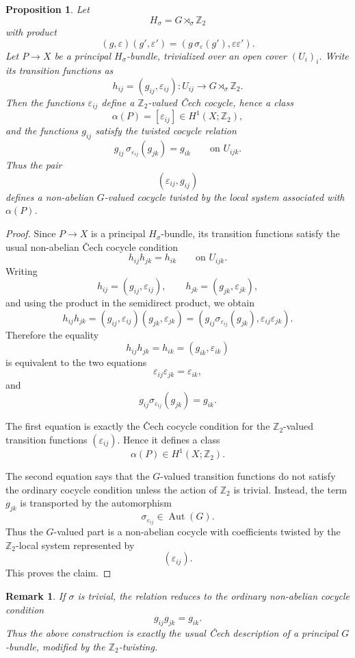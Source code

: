 \documentclass[11pt]{amsart}
\newtheorem{proposition}[definition]{Proposition}
\newtheorem{remark}[definition]{Remark}
\begin{document}
\begin{proposition}
Let
\[
H_\sigma=G\rtimes_\sigma \mathbb Z_2
\]
with product
\[
(g,\varepsilon)(g',\varepsilon')
=
(g\,\sigma_\varepsilon(g'),\varepsilon\varepsilon').
\]
Let \(P\to X\) be a principal \(H_\sigma\)-bundle, trivialized over an open
cover \((U_i)_i\). Write its transition functions as
\[
h_{ij}=(g_{ij},\varepsilon_{ij})
:
U_{ij}\to G\rtimes_\sigma\mathbb Z_2.
\]
Then the functions \(\varepsilon_{ij}\) define a \(\mathbb Z_2\)-valued
Čech cocycle, hence a class
\[
\alpha(P)=[\varepsilon_{ij}]\in H^1(X;\mathbb Z_2),
\]
and the functions \(g_{ij}\) satisfy the twisted cocycle relation
\[
g_{ij}\,\sigma_{\varepsilon_{ij}}(g_{jk})
=
g_{ik}
\qquad
\text{on }U_{ijk}.
\]
Thus the pair
\[
(\varepsilon_{ij},g_{ij})
\]
defines a non-abelian \(G\)-valued cocycle twisted by the local system
associated with \(\alpha(P)\).
\end{proposition}

\begin{proof}
Since \(P\to X\) is a principal \(H_\sigma\)-bundle, its transition functions
satisfy the usual non-abelian Čech cocycle condition
\[
h_{ij}h_{jk}=h_{ik}
\qquad
\text{on }U_{ijk}.
\]
Writing
\[
h_{ij}=(g_{ij},\varepsilon_{ij}),
\qquad
h_{jk}=(g_{jk},\varepsilon_{jk}),
\]
and using the product in the semidirect product, we obtain
\[
h_{ij}h_{jk}
=
(g_{ij},\varepsilon_{ij})(g_{jk},\varepsilon_{jk})
=
(g_{ij}\sigma_{\varepsilon_{ij}}(g_{jk}),
\varepsilon_{ij}\varepsilon_{jk}).
\]
Therefore the equality
\[
h_{ij}h_{jk}=h_{ik}
=
(g_{ik},\varepsilon_{ik})
\]
is equivalent to the two equations
\[
\varepsilon_{ij}\varepsilon_{jk}
=
\varepsilon_{ik},
\]
and
\[
g_{ij}\sigma_{\varepsilon_{ij}}(g_{jk})
=
g_{ik}.
\]

The first equation is exactly the Čech cocycle condition for the
\(\mathbb Z_2\)-valued transition functions \((\varepsilon_{ij})\). Hence it
defines a class
\[
\alpha(P)\in H^1(X;\mathbb Z_2).
\]

The second equation says that the \(G\)-valued transition functions do not
satisfy the ordinary cocycle condition unless the action of \(\mathbb Z_2\)
is trivial. Instead, the term \(g_{jk}\) is transported by the automorphism
\[
\sigma_{\varepsilon_{ij}}\in \operatorname{Aut}(G).
\]
Thus the \(G\)-valued part is a non-abelian cocycle with coefficients twisted
by the \(\mathbb Z_2\)-local system represented by
\[
(\varepsilon_{ij}).
\]
This proves the claim.
\end{proof}
\begin{remark}
If \(\sigma\) is trivial, the relation reduces to the ordinary non-abelian
cocycle condition
\[
g_{ij}g_{jk}=g_{ik}.
\]
Thus the above construction is exactly the usual Čech description of a
principal \(G\)-bundle, modified by the \(\mathbb Z_2\)-twisting.
\end{remark}
\end{document}
